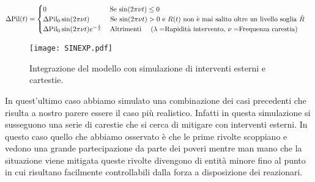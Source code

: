 \begin{itemize}
\begin{equation}
	\Delta\text{Pil}(t)=
	\begin{cases}
		0 \qquad\qquad\qquad\qquad\quad \,\text{Se $ \sin(2\pi\nu t)\leq 0 $}\\
		\Delta\text{Pil}_0\sin(2\pi\nu t) \qquad \quad \text{Se $ \sin(2\pi\nu t)>0 $ e $R(t)$ non è mai salito oltre un livello soglia $\tilde{R}$}\\
		\Delta\text{Pil}_0\sin(2\pi\nu t)e^{-\frac{t}{\lambda}} \quad \, \text{Altrimenti}\quad     \text{ ($\lambda=$Rapidità intervento, $\nu=$Frequenza carestia)}
	\end{cases}
\end{equation}
\begin{figure}[H]
	\centering
	\texttt{[image: SINEXP.pdf]}
	\caption{Integrazione del modello con simulazione di interventi esterni e cartestie.}
\end{figure}
In quest'ultimo caso abbiamo simulato una combinazione dei casi precedenti che risulta a nostro parere essere il caso più realistico. Infatti in questa simulazione si susseguono una serie di carestie che si cerca di mitigare con interventi esterni. In questo caso quello che abbiamo osservato è che le prime rivolte scoppiano e vedono una grande partecipazione da parte dei poveri mentre man mano che la situazione viene mitigata queste rivolte divengono di entità minore fino al punto in cui risultano facilmente controllabili dalla forza a disposizione dei reazionari.
\end{itemize}
\newpage
